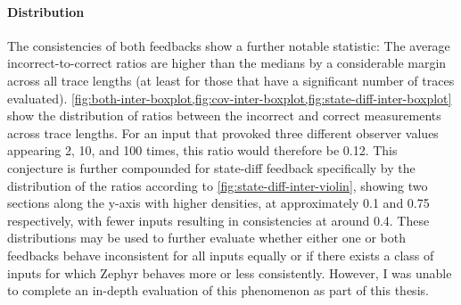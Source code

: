 \documentclass[twocolumn]{article}
\begin{document}
\paragraph{Distribution}

The consistencies of both feedbacks show a further notable statistic: The average incorrect-to-correct ratios are higher than the medians by a considerable margin across all trace lengths (at least for those that have a significant number of traces evaluated). \cref{fig:both-inter-boxplot,fig:cov-inter-boxplot,fig:state-diff-inter-boxplot} show the distribution of ratios between the incorrect and correct measurements across trace lengths. For an input that provoked three different observer values appearing 2, 10, and 100 times, this ratio would therefore be 0.12. This conjecture is further compounded for state-diff feedback specifically by the distribution of the ratios according to \cref{fig:state-diff-inter-violin}, showing two sections along the y-axis with higher densities, at approximately 0.1 and 0.75 respectively, with fewer inputs resulting in consistencies at around 0.4. These distributions may be used to further evaluate whether either one or both feedbacks behave inconsistent for all inputs equally or if there exists a class of inputs for which Zephyr behaves more or less consistently. However, I was unable to complete an in-depth evaluation of this phenomenon as part of this thesis.
\end{document}
